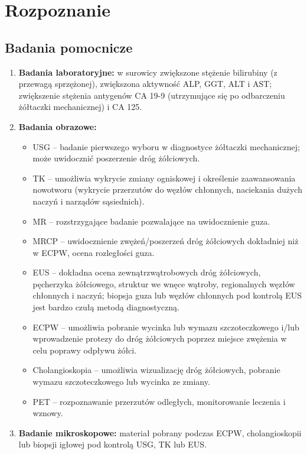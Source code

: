 \section{Rozpoznanie}

\subsection{Badania pomocnicze}

\begin{enumerate}
    \item \textbf{Badania laboratoryjne:} w surowicy zwiększone stężenie bilirubiny (z przewagą sprzężonej), zwiększona aktywność ALP, GGT, ALT i AST; zwiększenie stężenia antygenów CA 19-9 (utrzymujące się po odbarczeniu żółtaczki mechanicznej) i CA 125.

    \item \textbf{Badania obrazowe:} 
    
    \begin{itemize}
        \item USG – badanie pierwszego wyboru w diagnostyce żółtaczki mechanicznej; może uwidocznić poszerzenie dróg żółciowych. 
    
    \item TK – umożliwia wykrycie zmiany ogniskowej i określenie zaawansowania nowotworu (wykrycie przerzutów do węzłów chłonnych, naciekania dużych naczyń i narządów sąsiednich). 
    
    \item MR – rozstrzygające badanie pozwalające na uwidocznienie guza. 
    
    \item MRCP – uwidocznienie zwężeń/poszerzeń dróg żółciowych dokładniej niż w ECPW, ocena rozległości guza. 
    
    \item EUS – dokładna ocena zewnątrzwątrobowych dróg żółciowych, pęcherzyka żółciowego, struktur we wnęce wątroby, regionalnych węzłów chłonnych i naczyń; biopsja guza lub węzłów chłonnych pod kontrolą EUS jest bardzo czułą metodą diagnostyczną.
    
    \item ECPW – umożliwia pobranie wycinka lub wymazu szczoteczkowego i/lub wprowadzenie protezy do dróg żółciowych poprzez miejsce zwężenia w celu poprawy odpływu żółci. 
    
    \item Cholangioskopia – umożliwia wizualizację dróg żółciowych, pobranie wymazu szczoteczkowego lub wycinka ze zmiany. 
    
    \item PET – rozpoznawanie przerzutów odległych, monitorowanie leczenia i wznowy.
    \end{itemize}

    \item \textbf{Badanie mikroskopowe:} materiał pobrany podczas ECPW, cholangioskopii lub biopsji igłowej pod kontrolą USG, TK lub EUS.
\end{enumerate}

